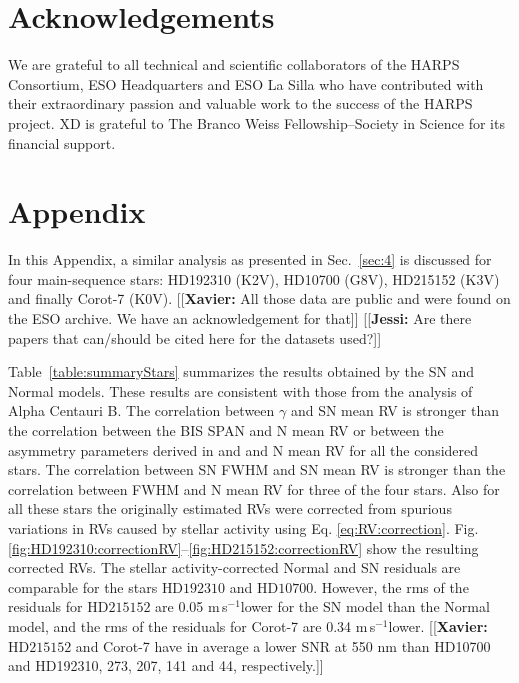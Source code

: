 \documentclass{aa}
\def\ms{\hbox{\,m\,s$^{-1}$}}         %
\newcommand{\jessi}[1]{{\color{Purple}[[\textbf{Jessi: }#1]]}}
\newcommand{\xavier}[1]{{\color{blue}[[\textbf{Xavier: }#1]]}}
\begin{document}
\section{Acknowledgements}

We are grateful to all technical and scientific collaborators of the HARPS Consortium, ESO Headquarters and ESO La Silla who have contributed with their extraordinary passion and valuable work to the success of the HARPS project.
XD is grateful to The Branco Weiss Fellowship--Society in Science for its financial support.


\appendix
\section{Appendix} \label{appendix}

In this Appendix, a similar analysis as presented in Sec.~\ref{sec:4} is discussed for four main-sequence stars: HD192310 (K2V), HD10700 (G8V), HD215152 (K3V) and finally Corot-7 (K0V). \xavier{All those data are public and were found on the ESO archive. We have an acknowledgement for that} \jessi{Are there papers that can/should be cited here for the datasets used?}

Table~\ref{table:summaryStars} summarizes the results obtained by the SN and Normal models. 
These results are consistent with those from the analysis of Alpha Centauri B. 
The correlation between $\gamma$ and SN mean RV is stronger than the correlation between the BIS SPAN and N mean RV or between the asymmetry parameters derived in \citet{Boisse-2009} and \citet{Figueira-2013} and N mean RV for all the considered stars. 
The correlation between SN FWHM and SN mean RV is stronger than the correlation between FWHM and N mean RV for three of the four stars.  Also for all these stars the originally estimated RVs were corrected from spurious variations in RVs caused by stellar activity using Eq. \ref{eq:RV:correction}. 
Fig. \ref{fig:HD192310:correctionRV}--\ref{fig:HD215152:correctionRV} show the resulting corrected RVs. 
The stellar activity-corrected Normal and SN residuals are comparable for the stars $\text{HD}192310$ and $\text{HD}10700$.
However, the rms of the residuals for $\text{HD}215152$ are 0.05\,\ms lower for the SN model than the Normal model, and the rms of the residuals for Corot-7 are 0.34\,\ms lower.  \xavier{$\text{HD}215152$ and Corot-7 have in average a lower SNR at 550 nm than HD10700 and HD192310, 273, 207, 141 and 44, respectively.}
\end{document}
